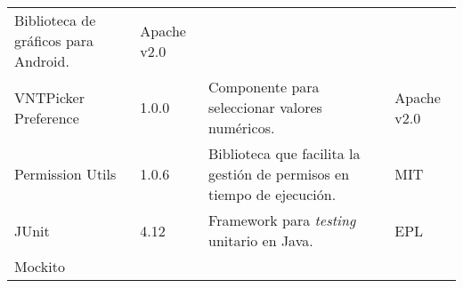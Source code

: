 \begin{longtable}[]{@{}llll@{}}
\begin{minipage}[t]{0.49\columnwidth}
Biblioteca de gráficos para Android.\strut
\end{minipage} & \begin{minipage}[t]{0.11\columnwidth}\raggedright\strut
Apache v2.0\strut
\end{minipage}\tabularnewline
\begin{minipage}[t]{0.18\columnwidth}\raggedright\strut
VNTPicker Preference\strut
\end{minipage} & \begin{minipage}[t]{0.08\columnwidth}\raggedright\strut
1.0.0\strut
\end{minipage} & \begin{minipage}[t]{0.49\columnwidth}\raggedright\strut
Componente para seleccionar valores numéricos.\strut
\end{minipage} & \begin{minipage}[t]{0.11\columnwidth}\raggedright\strut
Apache v2.0\strut
\end{minipage}\tabularnewline
\begin{minipage}[t]{0.18\columnwidth}\raggedright\strut
Permission Utils\strut
\end{minipage} & \begin{minipage}[t]{0.08\columnwidth}\raggedright\strut
1.0.6\strut
\end{minipage} & \begin{minipage}[t]{0.49\columnwidth}\raggedright\strut
Biblioteca que facilita la gestión de permisos en tiempo de
ejecución.\strut
\end{minipage} & \begin{minipage}[t]{0.11\columnwidth}\raggedright\strut
MIT\strut
\end{minipage}\tabularnewline
\begin{minipage}[t]{0.18\columnwidth}\raggedright\strut
JUnit\strut
\end{minipage} & \begin{minipage}[t]{0.08\columnwidth}\raggedright\strut
4.12\strut
\end{minipage} & \begin{minipage}[t]{0.49\columnwidth}\raggedright\strut
Framework para \emph{testing} unitario en Java.\strut
\end{minipage} & \begin{minipage}[t]{0.11\columnwidth}\raggedright\strut
EPL\strut
\end{minipage}\tabularnewline
\begin{minipage}[t]{0.18\columnwidth}\raggedright\strut
Mockito\strut
\end{minipage} & \begin{minipage}[t]{0.08\columnwidth}\raggedright\strut

\end{minipage}
\end{longtable}
